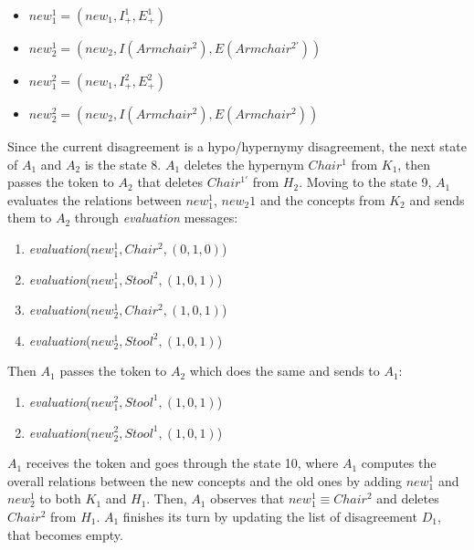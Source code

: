 \begin{itemize}
    \item $new_1^{1} = (new_1, I^{1}_{+}, E^{1}_{+})$
    \item $new_2^{1} = (new_2, I(Armchair^{2}), E(Armchair^{2'}))$
    \item $new_1^{2} = (new_1, I^{2}_{+}, E^{2}_{+})$
    \item $new_2^{2} = (new_2, I(Armchair^{2}), E(Armchair^{2}))$
\end{itemize}

Since the current disagreement is a hypo/hypernymy disagreement, the next state of $A_{1}$ and $A_{2}$ is the state 8. $A_{1}$ deletes the hypernym $Chair^{1}$ from $K_{1}$, then passes the token to $A_{2}$ that deletes $Chair^{1'}$ from $H_{2}$. Moving to the state 9, $A_{1}$ evaluates the relations between $new_1^{1}$, $new_2{1}$ and the concepts from $K_{2}$ and sends them to $A_{2}$ through \emph{evaluation} messages:

\begin{multicols}{2}
\begin{enumerate}
    \item \emph{evaluation}($new_1^{1}, Chair^{2}, (0,1,0)$)
    \item \emph{evaluation}($new_1^{1}, Stool^{2}, (1,0,1)$)
    \item \emph{evaluation}($new_2^{1}, Chair^{2}, (1,0,1)$)
    \item \emph{evaluation}($new_2^{1}, Stool^{2}, (1,0,1)$)
\end{enumerate}
\end{multicols}

Then $A_{1}$ passes the token to $A_{2}$ which does the same and sends to $A_{1}$:

\begin{multicols}{2}
\begin{enumerate}
    \item \emph{evaluation}($new_1^{2}, Stool^{1}, (1,0,1)$)
    \item \emph{evaluation}($new_2^{2}, Stool^{1}, (1,0,1)$)
\end{enumerate}
\end{multicols}

$A_{1}$ receives the token and goes through the state 10, where $A_{1}$ computes the overall relations between the new concepts and the old ones by adding $new_1^{1}$ and $new_2^{1}$ to both $K_{1}$ and $H_{1}$. Then, $A_{1}$ observes that $new_1^{1} \equiv Chair^{2}$ and deletes $Chair^{2}$ from $H_{1}$. $A_{1}$ finishes its turn by updating the list of disagreement $D_{1}$, that becomes empty.

